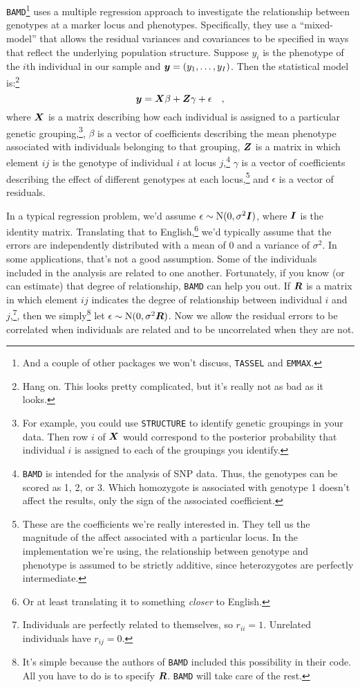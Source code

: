 {\tt BAMD}\footnote{And a couple of other packages we won't discuss,
  {\tt TASSEL} and {\tt EMMAX}.} uses a multiple regression approach
to investigate the relationship between genotypes at a marker locus
and phenotypes. Specifically, they use a ``mixed-model'' that allows
the residual variances and covariances to be specified in ways that
reflect the underlying population structure. Suppose $y_i$ is the
phenotype of the $i$th individual in our sample and
$\mbox{\boldmath$y$} = (y_1, \dots, y_I)$. Then the statistical model
is:\footnote{Hang on. This looks pretty complicated, but it's really
  not as bad as it looks.}
\[
\mbox{\boldmath$y$} = \mbox{\boldmath$X$}\beta +
\mbox{\boldmath$Z$}\gamma + \epsilon \quad ,
\]
where $\mbox{\boldmath$X$}$ is a matrix describing how each individual
is assigned to a particular genetic grouping,\footnote{For example,
  you could use {\tt STRUCTURE} to identify genetic groupings in your
  data. Then row $i$ of $\mbox{\boldmath$X$}$ would correspond to the
  posterior probability that individual $i$ is assigned to each of the
  groupings you identify.}, $\beta$ is a vector of coefficients
describing the mean phenotype associated with individuals belonging to
that grouping, $\mbox{\boldmath$Z$}$ is a matrix in which element $ij$
is the genotype of individual $i$ at locus $j$,\footnote{{\tt BAMD} is
  intended for the analysis of SNP data. Thus, the genotypes can be
  scored as 1, 2, or 3. Which homozygote is associated with genotype 1
  doesn't affect the results, only the sign of the associated
  coefficient.} $\gamma$ is a vector of coefficients describing the
effect of different genotypes at each locus,\footnote{These are the
  coefficients we're really interested in. They tell us the magnitude
  of the affect associated with a particular locus. In the
  implementation we're using, the relationship between genotype and
  phenotype is assumed to be strictly additive, since heterozygotes
  are perfectly intermediate.} and $\epsilon$ is a vector of
residuals.

In a typical regression problem, we'd assume $\epsilon \sim
\mbox{N}(0, \sigma^2\mbox{\boldmath$I$})$, where $\mbox{\boldmath$I$}$
is the identity matrix. Translating that to English,\footnote{Or at
  least translating it to something {\it closer\/} to English.} we'd
typically assume that the errors are independently distributed with a
mean of 0 and a variance of $\sigma^2$. In some applications, that's
not a good assumption. Some of the individuals included in the
analysis are related to one another. Fortunately, if you know (or can
estimate) that degree of relationship, {\tt BAMD} can help you out. If
$\mbox{\boldmath$R$}$ is a matrix in which element $ij$ indicates the
degree of relationship between individual $i$ and
$j$,\footnote{Individuals are perfectly related to themselves, so
  $r_{ii}=1$. Unrelated individuals have $r_{ij}=0$.}, then we
simply\footnote{It's simple because the authors of {\tt BAMD} included
  this possibility in their code. All you have to do is to specify
  $\mbox{\boldmath$R$}$. {\tt BAMD} will take care of the rest.} let
$\epsilon \sim \mbox{N}(0, \sigma^2\mbox{\boldmath$R$})$. Now we allow
the residual errors to be correlated when individuals are related and
to be uncorrelated when they are not. 

